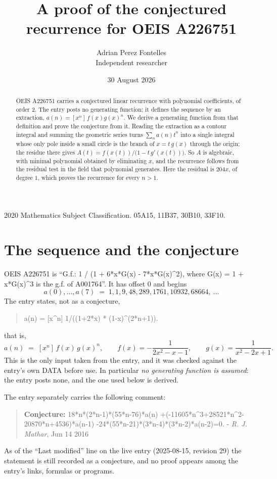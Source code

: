\documentclass[11pt,a4paper]{article}
\title{A proof of the conjectured recurrence for OEIS A226751}
\author{Adrian Perez Fontelles\\ \small Independent researcher}
\date{30 August 2026}
\theoremstyle{plain}
\theoremstyle{definition}
\begin{document}
\maketitle

\begin{abstract}
OEIS A226751 carries a conjectured linear recurrence with polynomial coefficients, of
order 2. The entry posts no generating function; it defines the sequence by an
extraction, $a(n)=[x^{n}]\,f(x)g(x)^{n}$. We derive a generating function from that
definition and prove the conjecture from it. Reading the extraction as a contour integral
and summing the geometric series turns $\sum_{n}a(n)t^{n}$ into a single integral whose
only pole inside a small circle is the branch of $x=t\,g(x)$ through the origin; the
residue there gives $A(t)=f(x(t))/\bigl(1-t\,g'(x(t))\bigr)$. So $A$ is algebraic, with
minimal polynomial obtained by eliminating $x$, and the recurrence follows from the
residual test in the field that polynomial generates. Here the residual is
$204 x$, of degree $1$, which proves the recurrence for every $n>1$.
\end{abstract}

\noindent\small 2020 Mathematics Subject Classification. 05A15, 11B37, 30B10, 33F10.\normalsize

\section{The sequence and the conjecture}

OEIS A226751 is ``G.f.: 1 / (1 + 6*x*G(x) - 7*x*G(x)\^{}2), where G(x) = 1 + x*G(x)\^{}3 is the g.f. of A001764''. It has offset $0$ and begins
\[
a(0),\dots,a(7)\;=\;1, 1, 9, 48, 289, 1761, 10932, 68664,\ \dots
\]
The entry states, not as a conjecture,
\begin{quote}\small
a(n) = [x\^{}n] 1/((1+2*x) * (1-x)\^{}(2*n+1)).
\end{quote}
that is,
\begin{equation}\label{eq:def}
a(n)\;=\;[x^{n}]\,f(x)\,g(x)^{n},
\qquad f(x)=- \frac{1}{2 x^{2} - x - 1},\qquad g(x)=\frac{1}{x^{2} - 2 x + 1} .
\end{equation}
This is the only input taken from the entry, and it was checked against the entry's own
DATA before use. In particular \emph{no generating function is assumed}: the entry posts
none, and the one used below is derived.

The entry separately carries the following comment:
\begin{quote}\small
\textbf{Conjecture:} 18*n*(2*n-1)*(55*n-76)*a(n) +(-11605*n\^{}3+28521*n\^{}2-20870*n+4536)*a(n-1) -24*(55*n-21)*(3*n-4)*(3*n-2)*a(n-2)=0. - \emph{R. J. Mathar}, Jun 14 2016
\end{quote}
As of the ``Last modified'' line on the live entry (2025-08-15, revision 29) the
statement is still recorded as a conjecture, and no proof appears among the entry's links,
formulas or programs.
\end{document}
